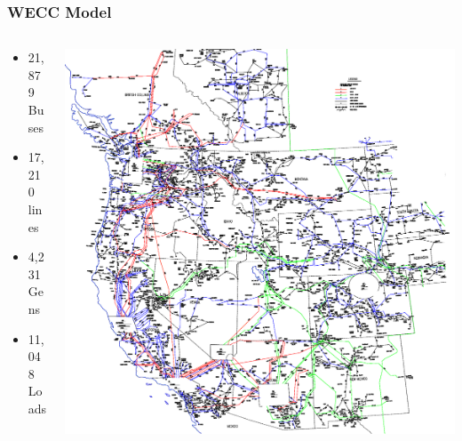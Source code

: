 \documentclass[14pt, unknownkeysallowed]{beamer}
\begin{document}
\begin{frame}
\frametitle{WECC Model}
\begin{columns}
\begin{column}{0.45\textwidth}
   \begin{itemize}
\item 21,879 Buses
\item 17,210 lines
\item 4,231 Gens
\item 11,048 Loads
\end{itemize}
\end{column}
\begin{column}{0.5\textwidth}
\includegraphics[height=.8\textheight]{WECCauto} %
\end{column}
\end{columns}
\end{frame}
\end{document}
